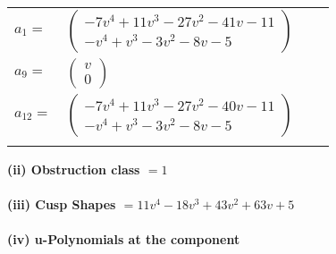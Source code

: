 \documentclass[1p]{elsarticle_modified}
\theoremstyle{definition}
\begin{document}
\begin{tabular}{m{7pt} m{180pt} m{7pt} m{180pt} }
\flushright $a_{1}=$&$\begin{pmatrix}-7 v^4+11 v^3-27 v^2-41 v-11\\- v^4+v^3-3 v^2-8 v-5\end{pmatrix}$ \\
\flushright $a_{9}=$&$\begin{pmatrix}v\\0\end{pmatrix}$ \\
\flushright $a_{12}=$&$\begin{pmatrix}-7 v^4+11 v^3-27 v^2-40 v-11\\- v^4+v^3-3 v^2-8 v-5\end{pmatrix}$\\&\end{tabular}
\flushleft \textbf{(ii) Obstruction class $= 1$}\\~\\
\flushleft \textbf{(iii) Cusp Shapes $= 11 v^4-18 v^3+43 v^2+63 v+5$}\\~\\
\newpage\renewcommand{\arraystretch}{1}
\flushleft \textbf{(iv) u-Polynomials at the component}\newline \\
\end{document}
